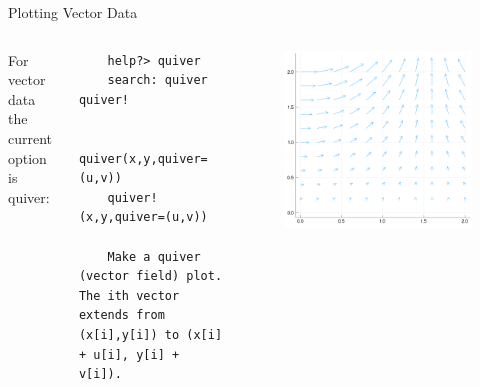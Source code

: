 \documentclass{beamer}
\begin{document}
\begin{frame}[fragile]{Plotting Vector Data}
	\begin{columns}
	For vector data the current option is quiver:
	\begin{lstlisting}
	help?> quiver
	search: quiver quiver!
	
	quiver(x,y,quiver=(u,v))
	quiver!(x,y,quiver=(u,v))
	
	Make a quiver (vector field) plot. The ith vector extends from (x[i],y[i]) to (x[i] + u[i], y[i] + v[i]).
	\end{lstlisting}
	\begin{figure}
		\centering
		\includegraphics[width=\textwidth]{images_data/quiver}
	\end{figure}
\end{columns}

\end{frame}
\end{document}
